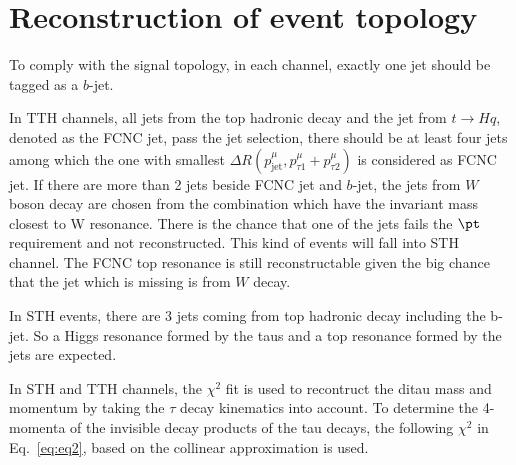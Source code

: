 \section{Reconstruction of event topology}
\label{sec:reconstruction}

To comply with the signal topology, in each channel, exactly one jet should be tagged as a $b$-jet. 

In TTH channels, all jets from the top hadronic decay and the jet from $t\to Hq$, denoted as the FCNC jet, pass the jet selection, there should be at least four jets among which the one with smallest $\Delta R(p^{\mu}_{\text{jet}},p^{\mu}_{\tau1}+p^{\mu}_{\tau2})$ is considered as FCNC jet. If there are more than 2 jets beside FCNC jet and $b$-jet, the jets from $W$ boson decay are chosen from the combination which have the invariant mass closest to W resonance. There is the chance that one of the jets fails the $\pt$ requirement and not reconstructed. This kind of events will fall into STH channel. The FCNC top resonance is still reconstructable given the big chance that the jet which is missing is from $W$ decay.

In STH events, there are 3 jets coming from top hadronic decay including the b-jet. So a Higgs resonance formed by the taus and a top resonance formed by the jets are expected.

In STH and TTH channels, the $\chi^2$ fit
is used to recontruct the ditau mass and momentum by taking the $\tau$ decay kinematics into account. To determine the 4-momenta of the invisible decay products of the tau decays, the following $\chi^2$ in Eq.~\ref{eq:eq2}, based on the collinear approximation is used.

